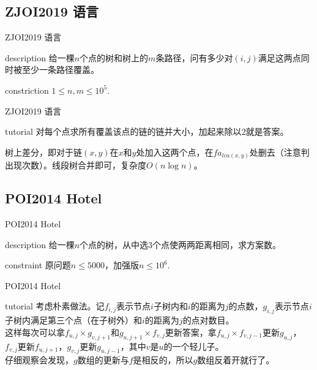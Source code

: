 \documentclass{beamer}
\begin{document}
\subsection{ZJOI2019 语言}
\begin{frame}{ZJOI2019 语言}
	\begin{block}{description}
		给一棵$n$个点的树和树上的$m$条路径，问有多少对$(i,j)$满足这两点同时被至少一条路径覆盖。
	\end{block}
	\begin{block}{constriction}
		$1 \le n, m \le 10^5.$
	\end{block}
\end{frame}
\begin{frame}{ZJOI2019 语言}
	\begin{block}{tutorial}
		对每个点求所有覆盖该点的链的链并大小，加起来除以$2$就是答案。
		
		树上差分，即对于链$(x,y)$在$x$和$y$处加入这两个点，在$fa_{lca(x,y)}$处删去（注意判出现次数）。线段树合并即可，复杂度$O(n\log n)$。
		
	\end{block}
\end{frame}

\subsection{POI2014 Hotel}
\begin{frame}{POI2014 Hotel}
	\begin{block}{description}
		给一棵$n$个点的树，从中选$3$个点使两两距离相同，求方案数。
	\end{block}
	\begin{block}{constraint}
		原问题$n \le 5000$，加强版$n \le 10^6.$
	\end{block}
\end{frame}
\begin{frame}{POI2014 Hotel}
	\begin{block}{tutorial}
		考虑朴素做法。记$f_{i,j}$表示节点$i$子树内和$i$的距离为$j$的点数，$g_{i,j}$表示节点$i$子树内满足第三个点（在子树外）和$i$的距离为$j$的点对数目。\\
		
		这样每次可以拿$f_{u,j}\times g_{v,j+1}$和$g_{u,j+1}\times f_{v,j}$更新答案，拿$f_{u,j}\times f_{v,j-1}$更新$g_{u,j}$，$f_{v,j}$更新$f_{u,j+1}$，$g_{v,j}$更新$g_{u,j-1}$，其中$v$是$u$的一个轻儿子。\\
		
		仔细观察会发现，$g$数组的更新与$f$是相反的，所以$g$数组反着开就行了。
		
	\end{block}
\end{frame}
\end{document}
